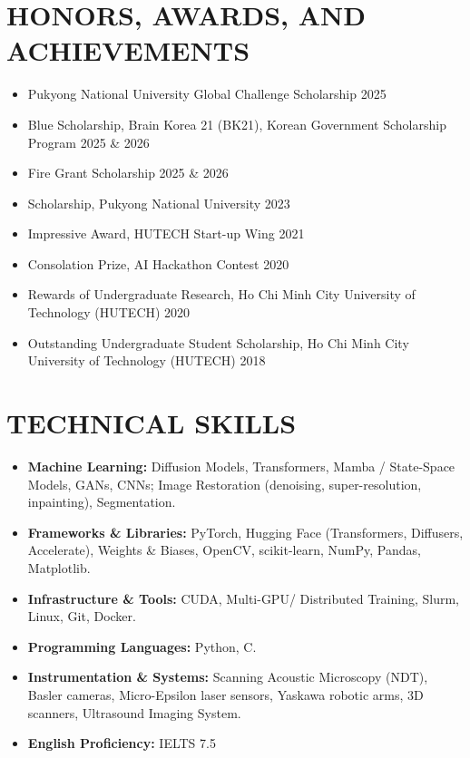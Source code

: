 \documentclass[a4paper,10pt]{extarticle}
\begin{document}
\section*{HONORS, AWARDS, AND ACHIEVEMENTS}
\begin{itemize}[leftmargin=*, itemsep=0pt, topsep=2pt]
    \item Pukyong National University Global Challenge Scholarship \hfill 2025
    \item Blue Scholarship, Brain Korea 21 (BK21), Korean Government Scholarship Program \hfill 2025 \& 2026
    \item Fire Grant Scholarship \hfill 2025 \& 2026
    \item Scholarship, Pukyong National University \hfill 2023
    \item Impressive Award, HUTECH Start-up Wing \hfill 2021
    \item Consolation Prize, AI Hackathon Contest \hfill 2020
    \item Rewards of Undergraduate Research, Ho Chi Minh City University of Technology (HUTECH) \hfill 2020
    \item Outstanding Undergraduate Student Scholarship, Ho Chi Minh City University of Technology (HUTECH) \hfill 2018
\end{itemize}

\section*{TECHNICAL SKILLS}
\begin{itemize}[leftmargin=*, itemsep=1pt, topsep=2pt]
    \item \textbf{Machine Learning:} Diffusion Models, Transformers, Mamba / State-Space Models, GANs, CNNs; Image Restoration (denoising, super-resolution, inpainting), Segmentation.
    \item \textbf{Frameworks \& Libraries:} PyTorch, Hugging Face (Transformers, Diffusers, Accelerate), Weights \& Biases, OpenCV, scikit-learn, NumPy, Pandas, Matplotlib.
    \item \textbf{Infrastructure \& Tools:} CUDA, Multi-GPU/ Distributed Training, Slurm, Linux, Git, Docker.
    \item \textbf{Programming Languages:} Python, C.
    \item \textbf{Instrumentation \& Systems:} Scanning Acoustic Microscopy (NDT), Basler cameras, Micro-Epsilon laser sensors, Yaskawa robotic arms, 3D scanners, Ultrasound Imaging System.
    \item \textbf{English Proficiency:} IELTS 7.5
\end{itemize}
\end{document}
